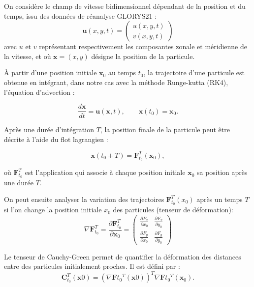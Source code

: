 	 On considère le champ de vitesse bidimensionnel dépendant de la position et du temps, issu des données de réanalyse GLORYS21 :
	 \begin{equation}
	 	\mathbf{u}(x,y,t)
	 	=
	 	\begin{pmatrix}
	 		u(x,y,t)\\
	 		v(x,y,t)
	 	\end{pmatrix}
	 \end{equation}
	 avec $u$ et $v$ représentant respectivement les composantes zonale et méridienne de la vitesse, et où $\mathbf{x}=(x,y)$ désigne la position de la particule.
	 
	 À partir d'une position initiale $\mathbf{x}_0$ au temps $t_0$, la trajectoire d'une particule est obtenue en intégrant, dans notre cas avec la méthode Runge-kutta (RK4), l'équation d'advection :
	 
	 \begin{equation}
	 	\frac{d\mathbf{x}}{dt}
	 	=
	 	\mathbf{u}(\mathbf{x},t),
	 	\qquad
	 	\mathbf{x}(t_0)=\mathbf{x}_0.
	 \end{equation}
	 
	 Après une durée d'intégration $T$, la position finale de la particule peut être décrite à l'aide du flot lagrangien :
	 
	 \begin{equation}
	 	\mathbf{x}(t_0+T)
	 	=
	 	\mathbf{F}_{t_0}^{T}(\mathbf{x}_0),
	 \end{equation}
	 
	 où $\mathbf{F}_{t_0}^{T}$ est l'application qui associe à chaque position initiale $\mathbf{x}_0$ sa position après une durée $T$.
	 
	 On peut ensuite analyser la variation des trajectoires $\mathbf{F}_{t_0}^T(x_0)$ après un temps $T$ si l'on change la position initiale $x_0$ des particules (tenseur de déformation): 
	 \begin{equation}
	 	\nabla \mathbf{F}_{t_0}^{T}
	 	=
	 	\frac{\partial \mathbf{F}_{t_0}^{T}}{\partial \mathbf{x}_0}
	 	=
	 	\begin{pmatrix}
	 		\frac{\partial F_x}{\partial x_0} &
	 		\frac{\partial F_x}{\partial y_0} \\[6pt]
	 		\frac{\partial F_y}{\partial x_0} &
	 		\frac{\partial F_y}{\partial y_0}
	 	\end{pmatrix}
	 \end{equation}
	 
	 Le tenseur de Cauchy-Green permet de quantifier la déformation des distances entre des particules initialement proches. Il est défini par :
	 \begin{equation}
	 	\mathbf{C}_{t_0}^{T}(\mathbf{x}0)
	 	=
	 	\left(
	 	\nabla\mathbf{F}{t_0}^{T}(\mathbf{x}0)
	 	\right)^{T}
	 	\nabla\mathbf{F}{t_0}^{T}(\mathbf{x}_0).
	 \end{equation}
	 
